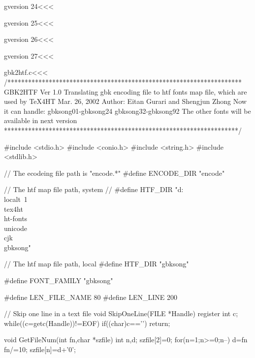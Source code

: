\<gversion 24\><<<

\<gversion 25\><<<

\<gversion 26\><<<

\<gversion 27\><<<

















\<gbk2htf.c\><<<
/********************************************************************
 GBK2HTF Ver 1.0
 Translating gbk encoding file to htf fonts map file, which
    are used by TeX4HT
 Mar. 26, 2002
 Author: Eitan Gurari and Shengjun Zhong
 Now it can handle:
    gbksong01-gbksong24
    gbksong32-gbksong92
 The other fonts will be available in next version
********************************************************************/

#include <stdio.h>
#include <conio.h>
#include <string.h>
#include <stdlib.h>

// The ecodeing file path is "encode\*.*"
#define ENCODE_DIR "encode"

// The htf map file path, system
// #define HTF_DIR "d:\\localt~1\\tex4ht\\ht-fonts\\unicode\\cjk\\gbksong"

// The htf map file path, local
#define HTF_DIR "gbksong"

#define FONT_FAMILY "gbksong"

#define LEN_FILE_NAME 80
#define LEN_LINE 200

// Skip one line in a text file
void SkipOneLine(FILE *Handle)
{
 register int c;
 while((c=getc(Handle))!=EOF) if((char)c=='\n') return;
}

void GetFileNum(int fn,char *szfile)
{
 int n,d;
 szfile[2]=0;
 for(n=1;n>=0;n--)
   {
    d=fn%
    fn/=10;
    szfile[n]=d+'0';
   }
}

